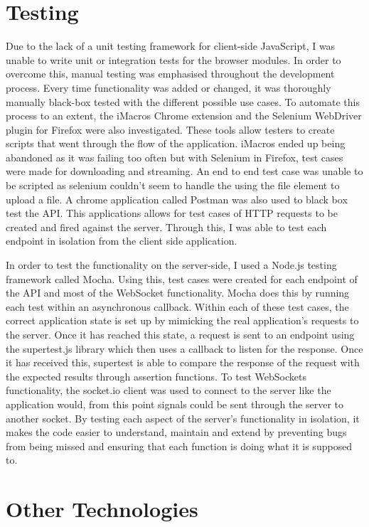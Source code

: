 \documentclass[]{report}
\begin{document}
		\section{Testing}
		Due to the lack of a unit testing framework for client-side JavaScript, I was unable to write unit or integration tests for the browser modules. In order to overcome this, manual testing was emphasised throughout the development process. Every time functionality was added or changed, it was thoroughly manually black-box tested with the different possible use cases. To automate this process to an extent, the iMacros Chrome extension and the Selenium WebDriver plugin for Firefox were also investigated. These tools allow testers to create scripts that went through the flow of the application. iMacros ended up being abandoned as it was failing too often but with Selenium in Firefox, test cases were made for downloading and streaming. An end to end test case was unable to be scripted as selenium couldn't seem to handle the using the file element to upload a file. A chrome application called Postman was also used to black box test the API. This applications allows for test cases of HTTP requests to be created and fired against the server. Through this, I was able to test each endpoint in isolation from the client side application. 
		
		In order to test the functionality on the server-side, I used a Node.js testing framework called Mocha. Using this, test cases were created for each endpoint of the API and most of the WebSocket functionality. Mocha does this by running each test within an asynchronous callback. Within each of these test cases, the correct application state is set up by mimicking the real application's requests to the server. Once it has reached this state, a request is sent to an endpoint using the supertest.js library which then uses a callback to listen for the response. Once it has received this, supertest is able to compare the response of the request with the expected results through assertion functions. To test WebSockets functionality, the socket.io client was used to connect to the server like the application would, from this point signals could be sent through the server to another socket. By testing each aspect of the server's functionality in isolation, it makes the code easier to understand, maintain and extend by preventing bugs from being missed and ensuring that each function is doing what it is supposed to.
		
		\section{Other Technologies}
\end{document}
